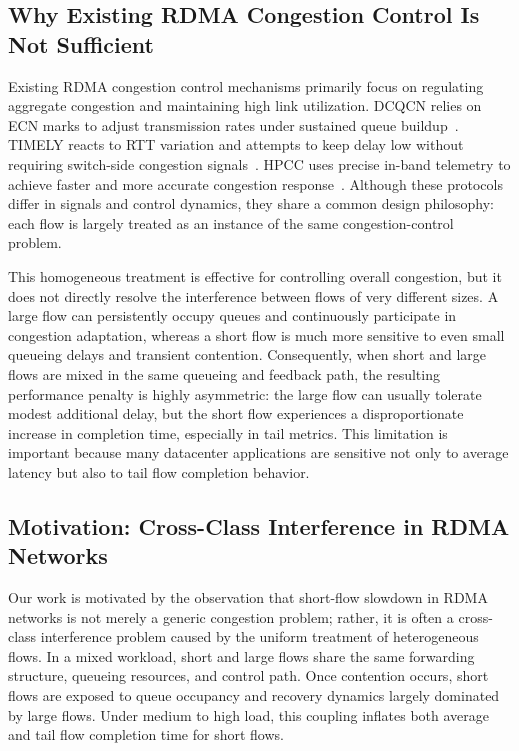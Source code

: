 \documentclass[conference]{IEEEtran}
\begin{document}
\subsection{Why Existing RDMA Congestion Control Is Not Sufficient}

Existing RDMA congestion control mechanisms primarily focus on regulating aggregate congestion and maintaining high link utilization. DCQCN relies on ECN marks to adjust transmission rates under sustained queue buildup~\cite{dcqcn}. TIMELY reacts to RTT variation and attempts to keep delay low without requiring switch-side congestion signals~\cite{timely}. HPCC uses precise in-band telemetry to achieve faster and more accurate congestion response~\cite{hpcc}. Although these protocols differ in signals and control dynamics, they share a common design philosophy: each flow is largely treated as an instance of the same congestion-control problem.

This homogeneous treatment is effective for controlling overall congestion, but it does not directly resolve the interference between flows of very different sizes. A large flow can persistently occupy queues and continuously participate in congestion adaptation, whereas a short flow is much more sensitive to even small queueing delays and transient contention. Consequently, when short and large flows are mixed in the same queueing and feedback path, the resulting performance penalty is highly asymmetric: the large flow can usually tolerate modest additional delay, but the short flow experiences a disproportionate increase in completion time, especially in tail metrics. This limitation is important because many datacenter applications are sensitive not only to average latency but also to tail flow completion behavior.

\subsection{Motivation: Cross-Class Interference in RDMA Networks}

Our work is motivated by the observation that short-flow slowdown in RDMA networks is not merely a generic congestion problem; rather, it is often a cross-class interference problem caused by the uniform treatment of heterogeneous flows. In a mixed workload, short and large flows share the same forwarding structure, queueing resources, and control path. Once contention occurs, short flows are exposed to queue occupancy and recovery dynamics largely dominated by large flows. Under medium to high load, this coupling inflates both average and tail flow completion time for short flows.
\end{document}
